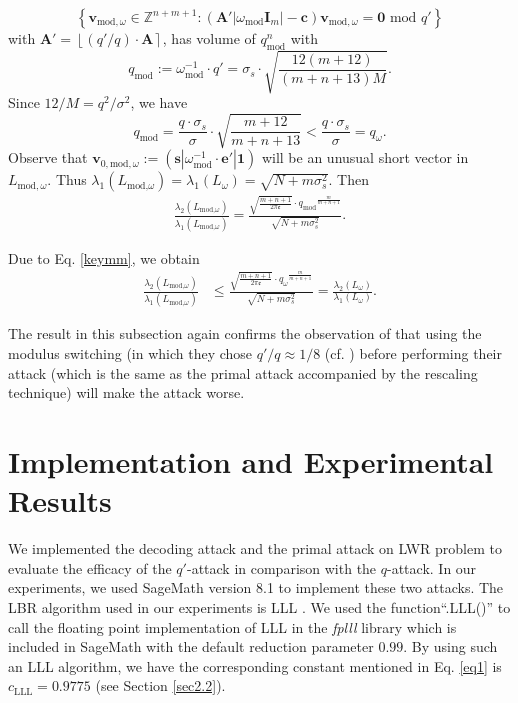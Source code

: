 \documentclass{cta-author}
\begin{document}
\begin{equation*}\label{primallanpq}
\left\{ \mathbf{v}_{\text{mod},\omega} \in \mathbb{Z}^{n+m+1}:(\mathbf{A}'| \omega_{\text{mod}}\mathbf{I}_m|-\mathbf{c})\mathbf{v}_{\text{mod},\omega}=\mathbf{0} \text{ mod } q' \right\}
\end{equation*}
with $\mathbf{A}'=\left\lfloor ({q'}/{q}) \cdot \mathbf{A} \right\rceil$, has volume of $q_{\text{mod}}^n$ with $$q_{\text{mod}}:=\omega_{\text{mod}}^{-1}\cdot q'=\sigma_s\cdot \sqrt{\frac{12(m+12)}{(m+n+13)M}}.$$
Since $12/M=q^2/\sigma^2$, we have
\begin{equation}\label{keymm}
q_{\text{mod}}=\frac{q\cdot\sigma_s}{\sigma}\cdot \sqrt{\frac{m+12}{m+n+13}} < \frac{q\cdot\sigma_s}{\sigma}=q_{\omega}.
\end{equation}
 Observe that $\mathbf{v}_{0, \text{mod},{\omega}}:=(\mathbf{s}| \omega_{\text{mod}}^{-1}\cdot \mathbf{e}'|\mathbf{1})$ will be an unusual short vector in $L_{\text{mod},\omega}$. Thus $\lambda_1(L_{\text{mod,}\omega})=\lambda_1(L_{\omega})=\sqrt{N+m\sigma_s^2}$.
 Then 
\begin{align*}
\frac{\lambda_2(L_{\text{mod,}\omega})}{\lambda_1(L_{\text{mod,}\omega})}=\frac{\sqrt{\frac{m+n+1}{2 \pi  \mathfrak{e}}}\cdot {q_{\text{mod}}}^{\frac{m}{m+n+1}}}{\sqrt{N+m\sigma_s^2}}.
\end{align*}


Due to Eq. \eqref{keymm}, we obtain \begin{align*}
\frac{\lambda_2(L_{\text{mod,}\omega})}{\lambda_1(L_{\text{mod,}\omega})}
&\leq \frac{\sqrt{\frac{m+n+1}{2 \pi  \mathfrak{e}}}\cdot {q_{\omega}}^{\frac{m}{m+n+1}}}{\sqrt{N+m\sigma_s^2}}=\frac{\lambda_2(L_{\omega})}{\lambda_1(L_{\omega})}.
\end{align*}

 The result in this subsection again confirms the observation of \cite{BG14} that using the modulus switching (in which they chose $q'/q\approx 1/8$ (cf. \cite[Section 5]{BG14}) before performing their attack (which is the same as the primal attack accompanied by the rescaling technique) will make the attack worse.



\section{Implementation and Experimental Results} \label{sec6}
We implemented the decoding attack and the primal attack on LWR problem to evaluate the efficacy of the $q'$-attack in comparison with the $q$-attack. In our experiments, we used SageMath version 8.1 \cite{Sag81} to implement these two attacks. The LBR algorithm used in our experiments is LLL \cite{LLL82}. We used the  function``.LLL()''  to call the floating point implementation of LLL in the \textit{fplll} library which is included in SageMath with the default reduction parameter $0.99$. By using such an LLL algorithm, we have the corresponding constant mentioned in Eq. \eqref{eq1} is $c_{\text{LLL}}=0.9775$ (see Section \ref{sec2.2}). 
\end{document}

